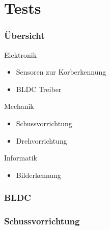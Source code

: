 \section{Tests} %
\begin{frame}
    \frametitle{Übersicht}
    \begin{block}{Elektronik}
        \begin{itemize}
            \item Sensoren zur Korberkennung
            \item BLDC Treiber
        \end{itemize}
    \end{block}
    \begin{block}{Mechanik}
        \begin{itemize}
            \item Schussvorrichtung
            \item Drehvorrichtung
        \end{itemize}
    \end{block}
    \begin{block}{Informatik}
        \begin{itemize}
            \item Bilderkennung
        \end{itemize}
    \end{block}
\end{frame}
\begin{frame}
    \frametitle{BLDC}
\end{frame}
\begin{frame}
    \frametitle{Schussvorrichtung}
\end{frame}
